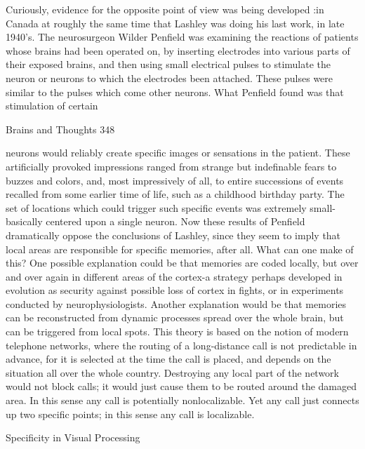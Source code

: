   Curiously, evidence for the opposite point of view was being developed :in Canada at
roughly the same time that Lashley was doing his last work, in late 1940's. The
neurosurgeon Wilder Penfield was examining the reactions of patients whose brains had
been operated on, by inserting electrodes into various parts of their exposed brains, and
then using small electrical pulses to stimulate the neuron or neurons to which the
electrodes been attached. These pulses were similar to the pulses which come other
neurons. What Penfield found was that stimulation of certain




Brains and Thoughts                                                                            348

neurons would reliably create specific images or sensations in the patient. These
artificially provoked impressions ranged from strange but indefinable fears to buzzes and
colors, and, most impressively of all, to entire successions of events recalled from some
earlier time of life, such as a childhood birthday party. The set of locations which could
trigger such specific events was extremely small-basically centered upon a single neuron.
Now these results of Penfield dramatically oppose the conclusions of Lashley, since they
seem to imply that local areas are responsible for specific memories, after all.
  What can one make of this? One possible explanation could be that memories are coded
locally, but over and over again in different areas of the cortex-a strategy perhaps
developed in evolution as security against possible loss of cortex in fights, or in
experiments conducted by neurophysiologists. Another explanation would be that
memories can be reconstructed from dynamic processes spread over the whole brain, but
can be triggered from local spots. This theory is based on the notion of modern telephone
networks, where the routing of a long-distance call is not predictable in advance, for it is
selected at the time the call is placed, and depends on the situation all over the whole
country. Destroying any local part of the network would not block calls; it would just
cause them to be routed around the damaged area. In this sense any call is potentially
nonlocalizable. Yet any call just connects up two specific points; in this sense any call is
localizable.

                             Specificity in Visual Processing

